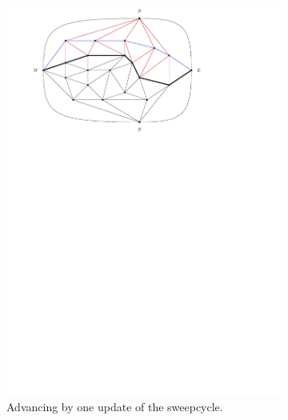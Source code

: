\begin{figure}
    \centering
    \ContinuedFloat
    \begin{subfigure}[b]{.9 \textwidth}
      \includegraphics[width=\textwidth]{examples/img/smallExample/smallExample-3}
      \caption{Advancing by one update of the sweepcycle.}
      \label{fig:ex:simple:3}
    \end{subfigure}
    ~
    \begin{subfigure}[b]{.9 \textwidth}

\end{subfigure}
\end{figure}
